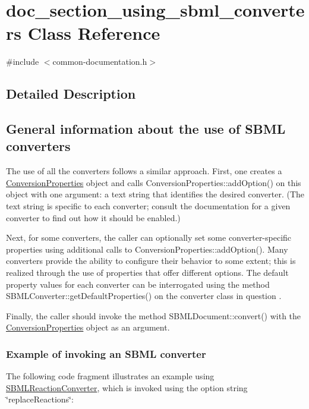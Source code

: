 \hypertarget{classdoc__section__using__sbml__converters}{}\section{doc\+\_\+section\+\_\+using\+\_\+sbml\+\_\+converters Class Reference}
\label{classdoc__section__using__sbml__converters}


{\ttfamily \#include $<$common-\/documentation.\+h$>$}



\subsection{Detailed Description}
\hypertarget{classdoc__section__using__sbml__converters_using-converters}{}\subsection{General information about the use of S\+B\+M\+L converters}\label{classdoc__section__using__sbml__converters_using-converters}
The use of all the converters follows a similar approach. First, one creates a \hyperlink{class_conversion_properties}{Conversion\+Properties} object and calls Conversion\+Properties\+::add\+Option() on this object with one argument\+: a text string that identifies the desired converter. (The text string is specific to each converter; consult the documentation for a given converter to find out how it should be enabled.)

Next, for some converters, the caller can optionally set some converter-\/specific properties using additional calls to Conversion\+Properties\+::add\+Option(). Many converters provide the ability to configure their behavior to some extent; this is realized through the use of properties that offer different options. The default property values for each converter can be interrogated using the method S\+B\+M\+L\+Converter\+::get\+Default\+Properties() on the converter class in question .

Finally, the caller should invoke the method S\+B\+M\+L\+Document\+::convert() with the \hyperlink{class_conversion_properties}{Conversion\+Properties} object as an argument.\hypertarget{classdoc__section__using__sbml__converters_converter-example}{}\subsubsection{Example of invoking an S\+B\+M\+L converter}\label{classdoc__section__using__sbml__converters_converter-example}
The following code fragment illustrates an example using \hyperlink{class_s_b_m_l_reaction_converter}{S\+B\+M\+L\+Reaction\+Converter}, which is invoked using the option string {\ttfamily \char`\"{}replace\+Reactions\char`\"{}}\+:

